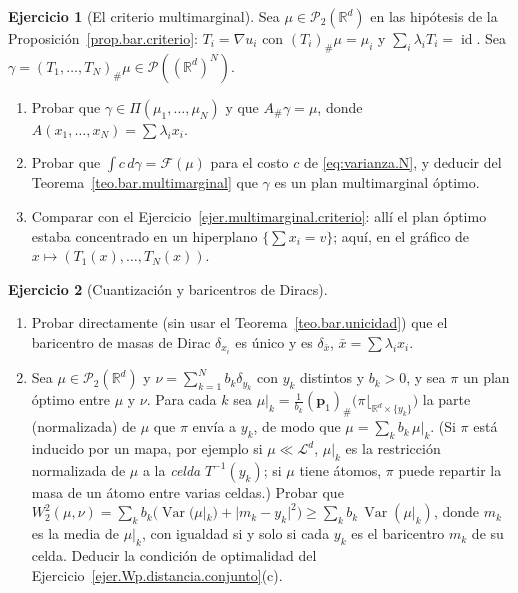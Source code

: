 \documentclass[12pt, a4paper]{amsbook}
\newcommand{\id}{\operatorname{id}}
\newcommand{\R}{{\mathbb R}}
\newcommand{\LL}{{\mathcal L}}
\newcommand{\pp}{{\mathbf p}}
\theoremstyle{remark}
\theoremstyle{definition}
\newtheorem{ejercicio}{Ejercicio}[chapter]
\numberwithin{section}{chapter}
\numberwithin{subsection}{section}
\numberwithin{equation}{section}
\numberwithin{figure}{chapter}
\begin{document}
\begin{ejercicio}[El criterio multimarginal]\label{ejer.bar.criterio.multimarginal}
Sea $\mu\in\mathcal P_2(\R^d)$ en las hipótesis de la
Proposición~\ref{prop.bar.criterio}: $T_i=\nabla u_i$ con $(T_i)_\#\mu=\mu_i$
y $\sum_i\lambda_iT_i=\id$. Sea $\gamma=(T_1,\dots,T_N)_\#\mu\in\mathcal P((\R^d)^N)$.
\begin{enumerate}[label=(\alph*)]
\item Probar que $\gamma\in\Pi(\mu_1,\dots,\mu_N)$ y que $A_\#\gamma=\mu$,
donde $A(x_1,\dots,x_N)=\sum\lambda_ix_i$.
\item Probar que $\int c\,d\gamma=\mathcal F(\mu)$ para el costo $c$ de
\eqref{eq:varianza.N}, y deducir del Teorema~\ref{teo.bar.multimarginal}
que $\gamma$ es un plan multimarginal óptimo.
\item Comparar con el Ejercicio~\ref{ejer.multimarginal.criterio}: allí el
plan óptimo estaba concentrado en un hiperplano $\{\sum x_i=v\}$; aquí, en
el gráfico de $x\mapsto(T_1(x),\dots,T_N(x))$.
\end{enumerate}
\end{ejercicio}

\begin{ejercicio}[Cuantización y baricentros de Diracs]\label{ejer.bar.cuantizacion}
\leavevmode
\begin{enumerate}[label=(\alph*)]
\item Probar directamente (sin usar el Teorema~\ref{teo.bar.unicidad}) que
el baricentro de masas de Dirac $\delta_{x_i}$ es único y es
$\delta_{\bar x}$, $\bar x=\sum\lambda_ix_i$.
\item Sea $\mu\in\mathcal P_2(\R^d)$ y $\nu=\sum_{k=1}^Nb_k\delta_{y_k}$ con
$y_k$ distintos y $b_k>0$, y sea $\pi$ un plan óptimo entre $\mu$ y $\nu$.
Para cada $k$ sea
$\mu|_k=\frac1{b_k}(\pp_1)_\#\bigl(\pi\lfloor_{\R^d\times\{y_k\}}\bigr)$ la
parte (normalizada) de $\mu$ que $\pi$ envía a $y_k$, de modo que
$\mu=\sum_kb_k\,\mu|_k$. (Si $\pi$ está inducido por un mapa, por ejemplo si
$\mu\ll\LL^d$, $\mu|_k$ es la restricción normalizada de $\mu$ a la
\emph{celda} $T^{-1}(y_k)$; si $\mu$ tiene átomos, $\pi$ puede repartir la
masa de un átomo entre varias celdas.) Probar que
$W_2^2(\mu,\nu)=\sum_kb_k\bigl(\operatorname{Var}(\mu|_k)+|m_k-y_k|^2\bigr)
\ge\sum_kb_k\,\operatorname{Var}(\mu|_k)$, donde $m_k$ es la media de
$\mu|_k$, con igualdad si y solo si cada $y_k$ es el baricentro $m_k$ de su
celda. Deducir la condición de optimalidad del
Ejercicio~\ref{ejer.Wp.distancia.conjunto}(c).
\end{enumerate}
\end{ejercicio}
\end{document}
